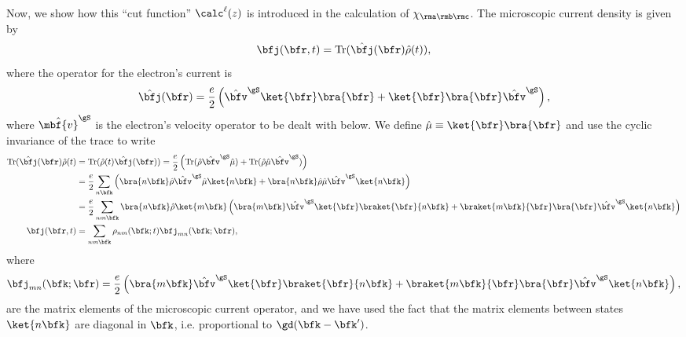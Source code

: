 \documentclass[floatfix,prb,aps,superscriptaddress,11pt,preprint,letterpaper]{revtex4}
\begin{document}
Now, we show how this ``cut function'' $\calc^\ell(z)$ is introduced in
the calculation of $\chi_{\rma\rmb\rmc}$.
The microscopic current density is given by
\begin{equation}\label{jmic}
\bfj(\bfr,t)=\mathrm{Tr}(\hat\bfj(\bfr)\hat\rho(t)),
\end{equation}
where the operator for the electron's current is
\begin{equation}\label{hatjmic}
\hat\bfj(\bfr)=\frac{e}{2}\left(\hat\bfv^\gS\ket{\bfr}\bra{\bfr}
+\ket{\bfr}\bra{\bfr}\hat\bfv^\gS\right), 
\end{equation}
where $\hat{\mbf{v}}^\gS$ is the electron's velocity operator to be dealt
with below. We define
$\hat\mu\equiv\ket{\bfr}\bra{\bfr}$ and use the cyclic invariance of
the trace to write
\begin{align}\label{jmic2}
\mathrm{Tr}(\hat\bfj(\bfr)\hat\rho(t)&=\mathrm{Tr}(\hat\rho(t)\hat\bfj(\bfr))=
\frac{e}{2}
\left(
\mathrm{Tr}(\hat\rho\hat\bfv^\gS\hat\mu)
+
\mathrm{Tr}(\hat\rho\hat\mu\hat\bfv^\gS)
\right)
\nonumber\\
&=
\frac{e}{2}
\sum_{n\bfk}
\left(
\bra{n\bfk}\hat\rho\hat\bfv^\gS\hat\mu\ket{n\bfk}
+
\bra{n\bfk}\hat\rho\hat\mu\hat\bfv^\gS\ket{n\bfk}
\right)
\nonumber\\
&=
\frac{e}{2}
\sum_{nm\bfk}
\bra{n\bfk}\hat\rho\ket{m\bfk}
\left(
\bra{m\bfk}\hat\bfv^\gS\ket{\bfr}\braket{\bfr}{n\bfk}
+
\braket{m\bfk}{\bfr}\bra{\bfr}\hat\bfv^\gS\ket{n\bfk}
\right)
\nonumber\\
\bfj(\bfr,t)&=
\sum_{nm\bfk}
\rho_{nm}(\bfk;t)\bfj_{mn}(\bfk;\bfr),
\end{align}
where
\begin{equation}\label{jmic3}
\bfj_{mn}(\bfk;\bfr)=
\frac{e}{2}
\left(
\bra{m\bfk}\hat\bfv^\gS\ket{\bfr}\braket{\bfr}{n\bfk}
+
\braket{m\bfk}{\bfr}\bra{\bfr}\hat\bfv^\gS\ket{n\bfk}
\right),
\end{equation}
are the matrix elements of the microscopic current operator,
and we have used the fact that the matrix elements between states $\ket{n\bfk}$
are diagonal in $\bfk$, i.e. proportional to $\gd(\bfk-\bfk')$.
\end{document}
